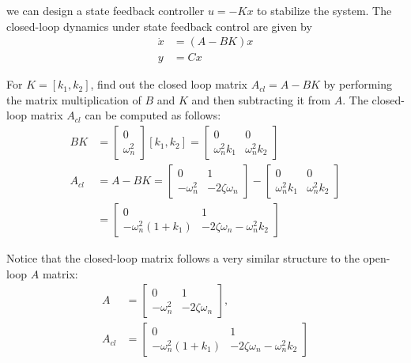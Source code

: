 \documentclass{ee122_notes}
\begin{document}
we can design a state feedback controller $u = -Kx$ to stabilize the system. The closed-loop dynamics under state feedback control are given by
\begin{align*}
    \dot x &= (A - BK)x \\
    y &= Cx
\end{align*}
\begin{popquiz}
For $K = [k_1, k_2]$, find out the closed loop matrix $A_{cl} = A - BK$ by performing the matrix multiplication of $B$ and $K$ and then subtracting it from $A$. 
\popqsplit 
The closed-loop matrix $A_{cl}$ can be computed as follows:
\begin{align*}
    BK &= \begin{bmatrix}
    0 \\
    \omega_n^2
    \end{bmatrix} [k_1, k_2] = \begin{bmatrix}
    0 & 0 \\
    \omega_n^2 k_1 & \omega_n^2 k_2
    \end{bmatrix} \\
    A_{cl} &= A - BK = \begin{bmatrix}
    0 & 1 \\
    -\omega_n^2 & -2\zeta \omega_n
    \end{bmatrix} - \begin{bmatrix}
    0 & 0 \\
    \omega_n^2 k_1 & \omega_n^2 k_2
    \end{bmatrix} 
    \\ &= \begin{bmatrix}
    0 & 1 \\
    -\omega_n^2 (1 + k_1) & -2\zeta \omega_n - \omega_n^2 k_2
    \end{bmatrix}
\end{align*}

\end{popquiz}
Notice that the closed-loop matrix follows a very similar structure to the open-loop $A$ matrix:
\begin{align*}
    A &= \begin{bmatrix}
    0 & 1 \\
    -\omega_n^2 & -2\zeta \omega_n
    \end{bmatrix},\\
     A_{cl} &= \begin{bmatrix}
    0 & 1 \\
    -\omega_n^2 (1 + k_1) & -2\zeta \omega_n - \omega_n^2 k_2
    \end{bmatrix}
\end{align*}
\end{document}
